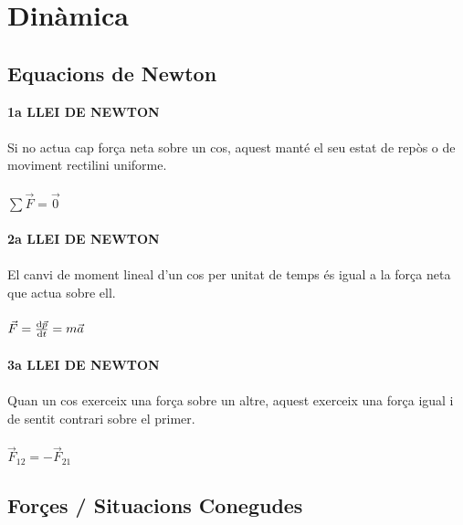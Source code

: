 \documentclass[11pt]{article}
\begin{document}
\section{Dinàmica}
\subsection{Equacions de Newton}

\begin{tcolorbox}[
    title=Fórmules Bàsiques,
    colback=IndianRed!5!white,
    colframe=IndianRed!70!black,
    coltitle=white,
    colbacktitle=IndianRed!70!black,
    fonttitle=\bfseries,
    arc=6pt,
    boxrule=0.8pt
]

\textbf{1a LLEI DE NEWTON}\\
\\
Si no actua cap força neta sobre un cos, aquest manté el seu estat de repòs o de moviment rectilini uniforme.\\
\\
$\sum \vec{F} = \vec{0}$\\
\\
\textbf{2a LLEI DE NEWTON}\\
\\
El canvi de moment lineal d'un cos per unitat de temps és igual a la força neta que actua sobre ell.\\
\\
$\vec{F} = \dv{\vec{p}}{t} = m\vec{a}$\\
\\
\textbf{3a LLEI DE NEWTON}\\
\\
Quan un cos exerceix una força sobre un altre, aquest exerceix una força igual i de sentit contrari sobre el primer.\\
\\
$\vec{F}_{12} = -\vec{F}_{21}$\\
\end{tcolorbox}

\subsection{Forçes / Situacions Conegudes}
\end{document}
